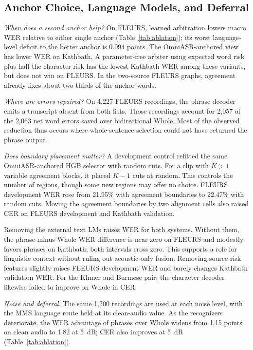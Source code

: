 \documentclass[conference,letterpaper]{IEEEtran}
\begin{document}
\subsection{Anchor Choice, Language Models, and Deferral}\label{sec:ablation}
\emph{When does a second anchor help?} On FLEURS, learned arbitration lowers macro WER relative to either single anchor (Table~\ref{tab:ablation}); its worst language-level deficit to the better anchor is 0.094 points. The OmniASR-anchored view has lower WER on Kathbath. A parameter-free arbiter using expected word risk plus half the character risk has the lowest Kathbath WER among these variants, but does not win on FLEURS. In the two-source FLEURS graphs, agreement already fixes about two thirds of the anchor words.

\emph{Where are errors repaired?} On 4,227 FLEURS recordings, the phrase decoder emits a transcript absent from both lists. Those recordings account for 2,057 of the 2,063 net word errors saved over bidirectional Whole. Most of the observed reduction thus occurs where whole-sentence selection could not have returned the phrase output.

\emph{Does boundary placement matter?} A development control refitted the same OmniASR-anchored HGB selector with random cuts. For a clip with $K>1$ variable agreement blocks, it placed $K-1$ cuts at random. This controls the number of regions, though some new regions may offer no choice. FLEURS development WER rose from 21.95\% with agreement boundaries to 22.47\% with random cuts. Moving the agreement boundaries by two alignment cells also raised CER on FLEURS development and Kathbath validation.

Removing the external text LMs raises WER for both systems. Without them, the phrase-minus-Whole WER difference is near zero on FLEURS and modestly favors phrases on Kathbath; both intervals cross zero. This supports a role for linguistic context without ruling out acoustic-only fusion. Removing source-risk features slightly raises FLEURS development WER and barely changes Kathbath validation WER. For the Khmer and Burmese pair, the character decoder likewise failed to improve on Whole in CER.

\emph{Noise and deferral.} The same 1,200 recordings are used at each noise level, with the MMS language route held at its clean-audio value. As the recognizers deteriorate, the WER advantage of phrases over Whole widens from 1.15 points on clean audio to 1.82 at 5~dB; CER also improves at 5~dB (Table~\ref{tab:ablation}).
\end{document}
